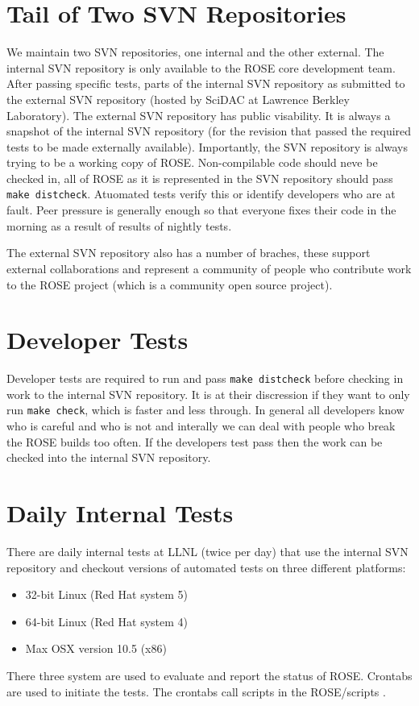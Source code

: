 \section{Tail of Two SVN Repositories}
\label{testing::twoRepositories}
   We maintain two SVN repositories, one internal and the other external.
The internal SVN repository is only available to the ROSE core
development team.  After passing specific tests, parts of the internal
SVN repository as submitted to the external SVN repository (hosted by SciDAC at 
Lawrence Berkley Laboratory).  The external SVN repository has public
visability.  It is always a snapshot of the internal SVN repository 
(for the revision that passed the required tests to be made externally available).
Importantly, the SVN repository is always trying to be a working copy of
ROSE. Non-compilable code should neve be checked in, all of ROSE as it
is represented in the SVN repository should pass {\tt make distcheck}.
Atuomated tests verify this or identify developers who are at fault.
Peer pressure is generally enough so that everyone fixes their code 
in the morning as a result of results of nightly tests.

   The external SVN repository also has a number of braches, these support
external collaborations and represent a community of people who contribute
work to the ROSE project (which is a community open source project).


\section{Developer Tests}
\label{testing::developerTests}
   Developer tests are required to run and pass {\tt make distcheck}
before checking in work to the internal SVN repository.  It is at
their discression if they want to only run {\tt make check}, which is
faster and less through. In general all developers know who is careful and
who is not and interally we can deal with people who break the ROSE 
builds too often.  If the developers test pass then the work
can be checked into the internal SVN repository.

\section{Daily Internal Tests}
\label{testing::dailyInternalTests}
   There are daily internal tests at LLNL (twice per day)
that use the internal SVN repository and checkout versions
of automated tests on three different platforms:
\begin{itemize}
   \item 32-bit Linux (Red Hat system 5)
   \item 64-bit Linux (Red Hat system 4)
   \item Max OSX version 10.5 (x86)
\end{itemize}
There three system are used to evaluate and report the status of ROSE.  Crontabs are used
to initiate the tests.  The crontabs call scripts in the ROSE/scripts
.



